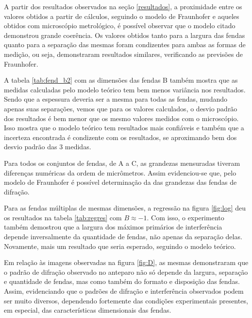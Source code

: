 A partir dos resultados observados na seção \ref{resultados}, a proximidade entre os valores obtidos a partir de cálculos, seguindo o modelo de Fraunhofer e aqueles obtidos com microscópio metrológico, é possível observar que o modelo citado demonstrou grande coerência. Os valores obtidos tanto para a largura das fendas quanto para a separação das mesmas foram condizentes para ambas as formas de medição, ou seja, demonstraram resultados similares, verificando as previsões de Fraunhofer.

A tabela \ref{tab:fend_b2} com as dimensões das fendas B também mostra que as medidas calculadas pelo modelo teórico tem bem menos variância nos resultados. Sendo que a espessura deveria ser a mesma para todas as fendas, mudando apenas suas separações, vemos que para os valores calculados, o desvio padrão dos resultados é bem menor que os mesmo valores medidos com o microscópio. Isso mostra que o modelo teórico tem resultados mais confiáveis e também que a incerteza encontrada é condizente com os resultados, se aproximando bem dos desvio padrão das 3 medidas.

Para todos os conjuntos de fendas, de A a C, as grandezas mensuradas tiveram diferenças numéricas da ordem de micrômetros. Assim evidenciou-se que, pelo modelo de Fraunhofer é possível determinação da das grandezas das fendas de difração.

Para as fendas múltiplas de mesmas dimensões, a regressão na figura \ref{fig:log} deu os resultados na tabela \ref{tab:regres} com $B \approx -1$. Com isso, o experimento também demostrou que a largura dos máximos primários de interferência depende inversalmente da quantidade de fendas, não apenas da separação delas. Novamente, mais um resultado que seria esperado, seguindo o modelo teórico.

Em relação às imagens observadas na figura \ref{fig:D}, as mesmas demonstraram que o padrão de difração observado no anteparo não só depende da largura, separação e quantidade de fendas, mas como também do formato e disposição das fendas. Assim, evidenciando que o padrões de difração e interferência observados podem ser muito diversos, dependendo fortemente das condições experimentais presentes, em especial, das características dimensionais das fendas.

